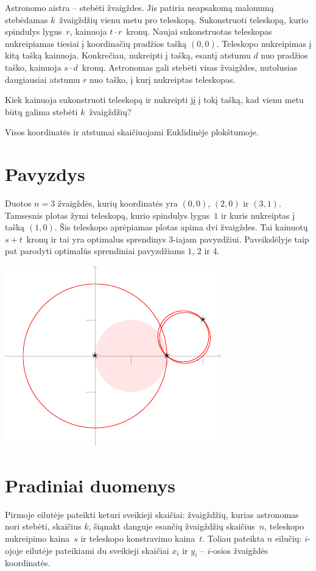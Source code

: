 
\noindent
Astronomo aistra -- stebėti žvaigždes.
Jis patiria neapsakomą malonumą stebėdamas $k$~žvaigždžių vienu metu pro teleskopą.
Sukonstruoti teleskopą, kurio spindulys lygus~$r$, kainuoja $t\cdot r$~kronų.
Naujai sukonstruotas teleskopas nukreipiamas tiesiai į koordinačių pradžios tašką $(0,0)$. 
Teleskopo nukreipimas į kitą tašką kainuoja. Konkrečiau,  nukreipti į tašką, esantį atstumu $d$ nuo pradžios taško, kainuoja $s\cdot d$~kronų.
Astronomas gali stebėti visas žvaigždes, nutolusias daugiausiai atstumu $r$ nuo taško, 
į kurį nukreiptas teleskopas.

Kiek kainuoja sukonstruoti teleskopą ir nukreipti jį į tokį tašką, kad vienu metu būtų galima stebėti $k$~žvaigždžių?

\medskip

Visos koordinatės ir atstumai skaičiuojami Euklidinėje plokštumoje.


\section*{Pavyzdys}

Duotos $n=3$ žvaigždės, kurių koordinatės yra $(0,0)$, $(2,0)$ ir $(3,1)$.
Tamsesnis plotas žymi teleskopą, kurio spindulys lygus~$1$ ir kuris nukreiptas į tašką $(1,0)$. Šis teleskopo aprėpiamas plotas apima dvi žvaigždes. Tai kainuotų $s + t$~kronų ir tai yra optimalus sprendinys $3$-iajam pavyzdžiui.
Paveikslėlyje taip pat parodyti optimalūs sprendiniai pavyzdžiams  $1$, $2$ ir $4$.

\medskip
\noindent
\includegraphics[width=.3\textwidth]{img/samples.pdf}


\section*{Pradiniai duomenys}

Pirmoje eilutėje pateikti keturi sveikieji skaičiai:
žvaigždžių, kurias astronomas nori stebėti, skaičius $k$,
šiąnakt danguje esančių žvaigždžių skaičius~$n$, 
teleskopo nukreipimo kaina~$s$ ir
teleskopo konstravimo kaina~$t$.
Toliau pateikta $n$ eilučių: $i$-ojoje eilutėje pateikiami du sveikieji skaičiai $x_i$ ir $y_i$ -- 
$i$-osios žvaigždės koordinatės.

